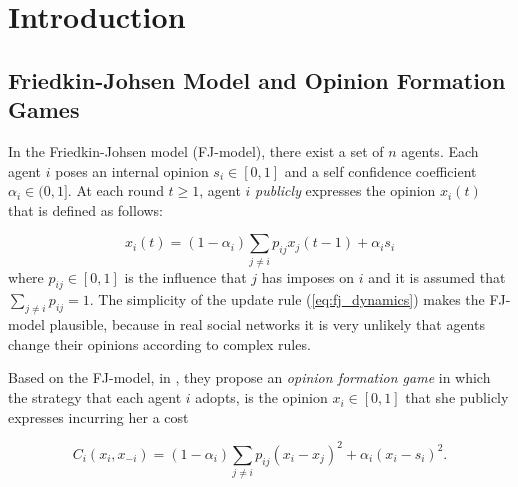 




\section{Introduction}

\subsection{Friedkin-Johsen Model and Opinion Formation Games}
In the Friedkin-Johsen model (FJ-model), there exist a set of $n$ agents.
Each agent $i$ poses an internal opinion $s_i \in [0,1]$ and a self
confidence coefficient $\alpha_i \in (0,1]$. At each round $t \geq 1$,
agent $i$ \emph{publicly} expresses the opinion $x_i(t)$ that is defined as follows:

\begin{equation}\label{eq:fj_dynamics}
  x_i(t) = (1-\alpha_i) \sum_{j \neq i}p_{ij}x_j(t-1) + \alpha_i s_i
\end{equation}
where $p_{ij} \in [0,1]$ is the influence that $j$ has
imposes on $i$ and it is assumed that $\sum_{j \neq i}p_{ij}=1$. The simplicity of the 
update rule (\ref{eq:fj_dynamics}) makes the FJ-model plausible, because in real social
networks it is very unlikely that agents change their opinions according
to complex rules.

Based on the FJ-model, in \cite{BKO11}, they propose an \emph{opinion formation game} 
in which the strategy that each agent
$i$ adopts, is the opinion $x_i \in [0,1]$
that she publicly expresses incurring her a cost

\begin{equation}\label{eq:kleinberg_cost}
  C_i(x_i,x_{-i})=(1-\alpha_i)\sum_{j \neq i}p_{ij}(x_i -x_j)^2 + \alpha_i(x_i-s_i)^2.
\end{equation}

